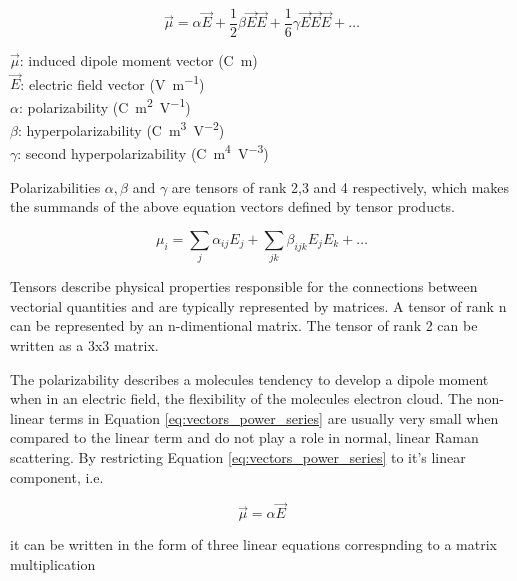 \begin{equation} \label{eq:vectors_power_series}
    \overrightarrow{\mu} = \alpha \overrightarrow{E} + \frac{1}{2} \beta \overrightarrow{E}\overrightarrow{E} + \frac{1}{6} \gamma \overrightarrow{E}\overrightarrow{E}\overrightarrow{E} + \dots
\end{equation}

\(\overrightarrow{\mu} \): induced dipole moment vector (\unit{\coulomb\meter})\\
\(\overrightarrow{E} \): electric field vector (\unit{\volt\per\meter})\\
\(\alpha\): polarizability (\unit{\coulomb\meter\squared\per\volt}) \\
\(\beta\): hyperpolarizability (\unit{\coulomb\meter\cubed\per\volt\squared}) \\
\(\gamma\): second hyperpolarizability (\unit{\coulomb\meter^4\volt^{-3}}) 

\bigskip

Polarizabilities \( \alpha, \beta\) and \( \gamma\) are tensors of rank 2,3 and 4 respectively, which makes the summands of the above equation vectors defined by tensor products. 


\begin{equation}
    \mu_i=\sum_{j}\alpha_{ij}E_j + \sum_{jk}\beta_{ijk}E_j E_k + \dots
\end{equation}



Tensors describe physical properties responsible for the connections between vectorial quantities and are typically represented by matrices. A tensor of rank n can be represented by an n-dimentional matrix. The tensor of rank 2 can be written as a 3x3 matrix.



The polarizability describes a molecules tendency to develop a dipole moment when in an electric field, the flexibility of the molecules electron cloud. The non-linear terms in Equation \ref{eq:vectors_power_series} are usually very small when compared to the linear term and do not play a role in normal, linear Raman scattering. By restricting Equation \ref{eq:vectors_power_series} to it's linear component, i.e.


\begin{equation} \label{eq:vectors_power_series_lin}
    \overrightarrow{\mu} = \alpha \overrightarrow{E}
\end{equation}

it can be written in the form of three linear equations correspnding to a matrix multiplication

